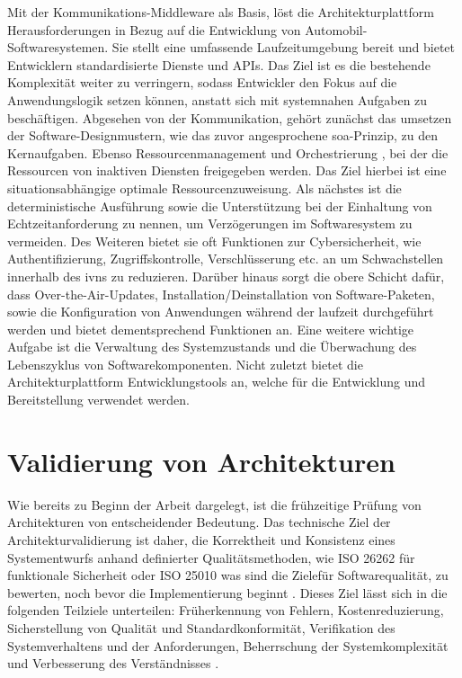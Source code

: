 Mit der Kommunikations-Middleware als Basis, löst die Architekturplattform Herausforderungen in Bezug auf die Entwicklung von Automobil-Softwaresystemen. Sie stellt eine umfassende Laufzeitumgebung bereit und bietet Entwicklern standardisierte Dienste und APIs. Das Ziel ist es die bestehende Komplexität weiter zu verringern, sodass Entwickler den Fokus auf die Anwendungslogik setzen können, anstatt sich mit systemnahen Aufgaben zu beschäftigen. Abgesehen von der Kommunikation, gehört zunächst das umsetzen der Software-Designmustern, wie das zuvor angesprochene \gls{soa}-Prinzip, zu den Kernaufgaben. Ebenso Ressourcenmanagement und Orchestrierung , bei der die Ressourcen von inaktiven Diensten freigegeben werden. Das Ziel hierbei ist eine situationsabhängige optimale Ressourcenzuweisung. Als nächstes ist die deterministische Ausführung sowie die Unterstützung bei der Einhaltung von Echtzeitanforderung zu nennen, um Verzögerungen im Softwaresystem zu vermeiden. Des Weiteren bietet sie oft Funktionen zur Cybersicherheit, wie Authentifizierung, Zugriffskontrolle, Verschlüsserung etc. an um Schwachstellen innerhalb des \glspl{ivn} zu reduzieren. Darüber hinaus sorgt die obere Schicht dafür, dass Over-the-Air-Updates, Installation/Deinstallation von Software-Paketen, sowie die Konfiguration von Anwendungen während der laufzeit durchgeführt werden und bietet dementsprechend Funktionen an. Eine weitere wichtige Aufgabe ist die Verwaltung des Systemzustands und die Überwachung des Lebenszyklus von Softwarekomponenten. Nicht zuletzt bietet die Architekturplattform Entwicklungstools an, welche für die Entwicklung und Bereitstellung verwendet werden.

\section{Validierung von Architekturen}
\label{sect:validerung}

Wie bereits zu Beginn der Arbeit dargelegt, ist die frühzeitige Prüfung von Architekturen von entscheidender Bedeutung. Das technische Ziel der Architekturvalidierung ist daher, die Korrektheit und Konsistenz eines Systementwurfs anhand definierter Qualitätsmethoden, wie  ISO 26262 für funktionale Sicherheit oder ISO 25010 was sind die Zielefür Softwarequalität, zu bewerten, noch bevor die Implementierung beginnt \cite{venkitachalam2015}. Dieses Ziel lässt sich in die folgenden Teilziele unterteilen: Früherkennung von Fehlern, Kostenreduzierung, Sicherstellung von Qualität und Standardkonformität, Verifikation des Systemverhaltens und der Anforderungen, Beherrschung der Systemkomplexität und Verbesserung des Verständnisses\cite{venkitachalam2015} \cite{kang2019formal} \cite{bucher2019crosslayera}.

